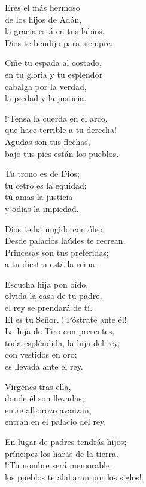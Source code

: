 \documentclass[letterpaper]{report}
\begin{document}
    Eres el m\'as hermoso\\
    de los hijos de Ad\'an,\\
    la gracia est\'a en tus labios.\\
    Dios te bendijo para siempre.
  
    Ci\~ne tu espada al costado,\\
    en tu gloria y tu esplendor\\
    cabalga por la verdad,\\
    la piedad y la justicia.
  
    !`Tensa la cuerda en el arco,\\
    que hace terrible a tu derecha!\\
    Agudas son tus flechas,\\
    bajo tus pies est\'an los pueblos.
  
    Tu trono es de Dios;\\
    tu cetro es la equidad;\\
    t\'u amas la justicia\\
    y odias la impiedad.
  
    Dios te ha ungido con \'oleo\\
    Desde palacios la\'udes te recrean.\\
    Princesas son tus preferidas;\\
    a tu diestra est\'a la reina.
  
    Escucha hija pon o\'ido,\\
    olvida la casa de tu padre,\\
    el rey se prendar\'a de t\'i.\\
    El es tu Se\~nor. !`P\'ostrate ante \'el!\\
  
    La hija de Tiro con presentes,\\
    toda espl\'endida, la hija del rey,\\
    con vestidos en oro;\\
    es llevada ante el rey.
  
    V\'irgenes tras ella,\\
    donde \'el son llevadas;\\
    entre alborozo avanzan,\\
    entran en el palacio del rey.
  
    En lugar de padres tendr\'as hijos;\\
    pr\'incipes los har\'as de la tierra.\\
    !`Tu nombre ser\'a memorable,\\
    los pueblos te alabaran por los siglos!
    \clearpage
    
\end{document}
